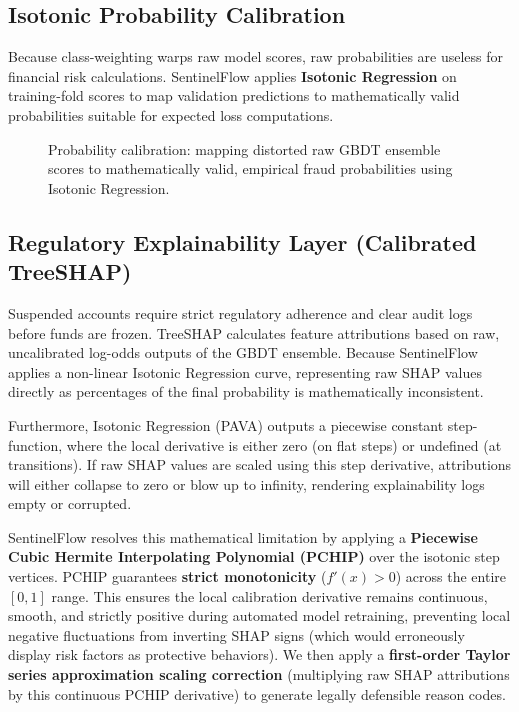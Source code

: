 \documentclass[11pt,a4paper]{article}
\begin{document}
\subsection*{Isotonic Probability Calibration}
Because class-weighting warps raw model scores, raw probabilities are useless for financial risk calculations. SentinelFlow applies \textbf{Isotonic Regression} on training-fold scores to map validation predictions to mathematically valid probabilities suitable for expected loss computations.

\begin{figure}[H]
\centering
{}
\caption{Probability calibration: mapping distorted raw GBDT ensemble scores to mathematically valid, empirical fraud probabilities using Isotonic Regression.}
\end{figure}

\subsection*{Regulatory Explainability Layer (Calibrated TreeSHAP)}
Suspended accounts require strict regulatory adherence and clear audit logs before funds are frozen. TreeSHAP calculates feature attributions based on raw, uncalibrated log-odds outputs of the GBDT ensemble. Because SentinelFlow applies a non-linear Isotonic Regression curve, representing raw SHAP values directly as percentages of the final probability is mathematically inconsistent. 

Furthermore, Isotonic Regression (PAVA) outputs a piecewise constant step-function, where the local derivative is either zero (on flat steps) or undefined (at transitions). If raw SHAP values are scaled using this step derivative, attributions will either collapse to zero or blow up to infinity, rendering explainability logs empty or corrupted.

SentinelFlow resolves this mathematical limitation by applying a \textbf{Piecewise Cubic Hermite Interpolating Polynomial (PCHIP)} over the isotonic step vertices. PCHIP guarantees \textbf{strict monotonicity} ($f'(x) > 0$) across the entire $[0, 1]$ range. This ensures the local calibration derivative remains continuous, smooth, and strictly positive during automated model retraining, preventing local negative fluctuations from inverting SHAP signs (which would erroneously display risk factors as protective behaviors). We then apply a \textbf{first-order Taylor series approximation scaling correction} (multiplying raw SHAP attributions by this continuous PCHIP derivative) to generate legally defensible reason codes.
\end{document}
